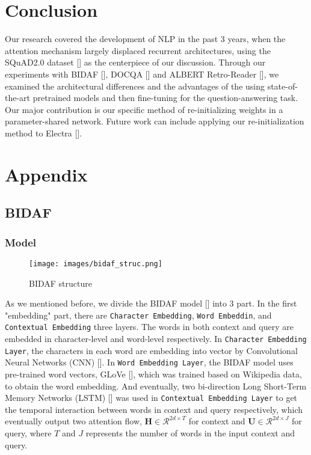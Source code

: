 \documentclass{article}
\begin{document}
\section{Conclusion}
Our research covered the development of NLP in the past 3 years, when the attention mechanism largely displaced recurrent architectures, using the SQuAD2.0 dataset [] as the centerpiece of our discussion.  Through our experiments with BIDAF [], DOCQA [] and ALBERT Retro-Reader [], we examined the architectural differences and the advantages of the using state-of-the-art pretrained models and then fine-tuning for the question-answering task.  Our major contribution is our specific method of re-initializing weights in a parameter-shared network.  Future work can include applying our re-initialization method to Electra  [].

\newpage
\section{Appendix}


\subsection{BIDAF}
\subsubsection{Model}

\begin{wrapfigure}{r}{0.6\textwidth} %
    \texttt{[image: images/bidaf\_struc.png]}
      \centering
      \caption{BIDAF structure}
      \label{fig:bidstruc}
\end{wrapfigure}

    As we mentioned before, we divide the BIDAF model [] into 3 part. In the first "embedding" part, there are \verb|Character Embedding|, \verb|Word Embeddin|, and \verb|Contextual Embedding| three layers. The words in both context and query are embedded in character-level and word-level respectively. In \verb|Character Embedding Layer|, the characters in each word are embedding into vector by Convolutional Neural Networks (CNN) []. In \verb|Word Embedding Layer|, the BIDAF model uses pre-trained word vectors, GLoVe [], which was trained based on Wikipedia data, to obtain the word embedding. And eventually, two bi-direction Long Short-Term Memory Networks (LSTM) [] was used in \verb|Contextual Embedding Layer| to get the temporal interaction between words in context and query respectively, which eventually output two attention flow, $\mathbf{H}\in\mathcal{R}^{2d\times T}$ for context and $\mathbf{U}\in\mathcal{R}^{2d\times J}$ for query, where $T$ and $J$ represents the number of words in the input context and query.
    
\end{document}
